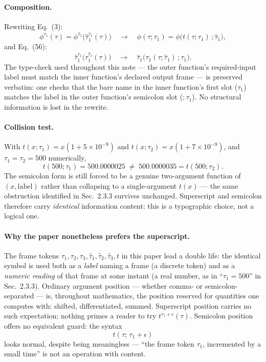 \documentclass[11pt]{article}
\begin{document}
\paragraph{Composition.} Rewriting Eq.~(3):
\begin{equation*}
  \phi^{\tau_1}(\tau) = \phi^{\hat\tau_1}\!\big(\hat\tau_1^{\tau_1}(\tau)\big)
  \quad\longrightarrow\quad
  \phi(\tau;\tau_1) = \phi\big(t(\tau;\tau_1)\,;\hat\tau_1\big),
\end{equation*}
and Eq.~(56):
\begin{equation*}
  \hat\tau_1^{\tau_1}\!\big(\tau_1^{\hat\tau_1}(\tau)\big)
  \quad\longrightarrow\quad
  \hat\tau_1\big(\tau_1(\tau;\hat\tau_1)\,;\tau_1\big).
\end{equation*}
The type-check used throughout this note — the outer function's
required-input label must match the inner function's declared output
frame — is preserved verbatim: one checks that the bare name in the
inner function's first slot ($\tau_1$) matches the label in the
outer function's semicolon slot ($;\tau_1$). No structural
information is lost in the rewrite.

\paragraph{Collision test.} With
$t(x;\tau_1) = x(1+5\times10^{-9})$ and
$t(x;\tau_2) = x(1+7\times10^{-9})$, and $\tau_1=\tau_2=500$
numerically,
\begin{equation*}
  t(500;\tau_1) = 500.0000025 \;\neq\; 500.0000035 = t(500;\tau_2).
\end{equation*}
The semicolon form is still forced to be a genuine two-argument
function of $(x,\text{label})$ rather than collapsing to a
single-argument $t(x)$ — the same obstruction identified in
Sec.~2.3.3 survives unchanged. Superscript and semicolon therefore
carry \emph{identical} information content: this is a typographic
choice, not a logical one.

\paragraph{Why the paper nonetheless prefers the superscript.} 
The frame tokens $\tau_1,\tau_2,\tau_3,\hat\tau_1,\hat\tau_2,\hat\tau_3,t$ in this paper lead a double life: the identical symbol is used both as a \emph{label} naming a frame (a discrete token) and as a \emph{numeric reading} of that frame at some instant (a real number, as in ``$\tau_1 = 500$'' in Sec.~2.3.3). Ordinary argument position — whether comma- or semicolon-separated — is, throughout mathematics, the position reserved for quantities one computes with: shifted, differentiated, summed. Superscript position carries no such expectation; nothing primes a reader to try $t^{\tau_1+\epsilon}(\tau)$. Semicolon position offers no equivalent guard: the syntax
\begin{equation*}
  t(\tau;\,\tau_1+\epsilon)
\end{equation*}
looks normal, despite being meaningless — ``the frame token $\tau_1$, incremented by a small time'' is not an operation with content. 
\end{document}
